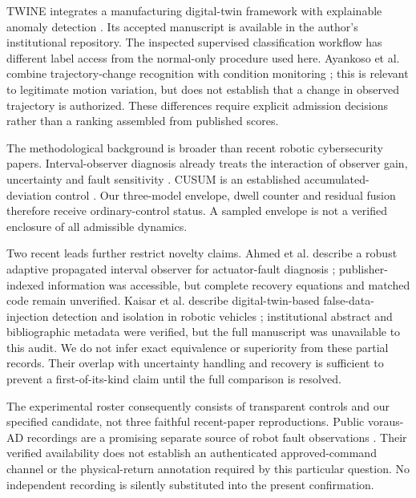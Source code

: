TWINE integrates a manufacturing digital-twin framework with explainable anomaly detection \cite{twine}. Its accepted manuscript is available in the author's institutional repository. The inspected supervised classification workflow has different label access from the normal-only procedure used here. Ayankoso et al. combine trajectory-change recognition with condition monitoring \cite{ayankoso}; this is relevant to legitimate motion variation, but does not establish that a change in observed trajectory is authorized. These differences require explicit admission decisions rather than a ranking assembled from published scores.

The methodological background is broader than recent robotic cybersecurity papers. Interval-observer diagnosis already treats the interaction of observer gain, uncertainty and fault sensitivity \cite{meseguer}. CUSUM is an established accumulated-deviation control \cite{nist}. Our three-model envelope, dwell counter and residual fusion therefore receive ordinary-control status. A sampled envelope is not a verified enclosure of all admissible dynamics.

Two recent leads further restrict novelty claims. Ahmed et al. describe a robust adaptive propagated interval observer for actuator-fault diagnosis \cite{rapio}; publisher-indexed information was accessible, but complete recovery equations and matched code remain unverified. Kaisar et al. describe digital-twin-based false-data-injection detection and isolation in robotic vehicles \cite{kaisar}; institutional abstract and bibliographic metadata were verified, but the full manuscript was unavailable to this audit. We do not infer exact equivalence or superiority from these partial records. Their overlap with uncertainty handling and recovery is sufficient to prevent a first-of-its-kind claim until the full comparison is resolved.

The experimental roster consequently consists of transparent controls and our specified candidate, not three faithful recent-paper reproductions. Public voraus-AD recordings are a promising separate source of robot fault observations \cite{voraus}. Their verified availability does not establish an authenticated approved-command channel or the physical-return annotation required by this particular question. No independent recording is silently substituted into the present confirmation.
